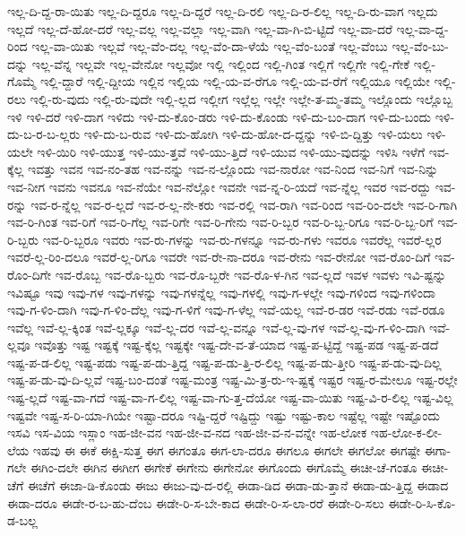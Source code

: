 {ಇಲ್ಲ-ದಿ-ದ್ದ-ರಾ-ಯಿತು
ಇಲ್ಲ-ದಿ-ದ್ದರೂ
ಇಲ್ಲ-ದಿ-ದ್ದರೆ
ಇಲ್ಲ-ದಿ-ರಲಿ
ಇಲ್ಲ-ದಿ-ರ-ಲಿಲ್ಲ
ಇಲ್ಲ-ದಿ-ರು-ವಾಗ
ಇಲ್ಲದು
ಇಲ್ಲದೆ
ಇಲ್ಲ-ದೆ-ಹೋ-ದರೆ
ಇಲ್ಲ-ವಲ್ಲ
ಇಲ್ಲ-ವಲ್ಲಾ
ಇಲ್ಲ-ವಾಗಿ
ಇಲ್ಲ-ವಾ-ಗಿ-ಬಿ-ಟ್ಟಿದೆ
ಇಲ್ಲ-ವಾ-ದರೆ
ಇಲ್ಲ-ವಾ-ದ್ದ-ರಿಂದ
ಇಲ್ಲ-ವಾ-ಯಿತು
ಇಲ್ಲವೆ
ಇಲ್ಲ-ವೆಂ-ದಲ್ಲ
ಇಲ್ಲ-ವೆಂ-ದಾ-ಳೆಯೆ
ಇಲ್ಲ-ವೆಂ-ಬಂತೆ
ಇಲ್ಲ-ವೆಂಬು
ಇಲ್ಲ-ವೆಂ-ಬು-ದನ್ನು
ಇಲ್ಲ-ವೆನ್ನ
ಇಲ್ಲವೇ
ಇಲ್ಲ-ವೇನೋ
ಇಲ್ಲವೋ
ಇಲ್ಲಿ
ಇಲ್ಲಿಂದ
ಇಲ್ಲಿ-ಗಿಂತ
ಇಲ್ಲಿಗೆ
ಇಲ್ಲಿಗೇ
ಇಲ್ಲಿ-ಗೇಕೆ
ಇಲ್ಲಿ-ಗೊಮ್ಮೆ
ಇಲ್ಲಿ-ದ್ದಾರೆ
ಇಲ್ಲಿ-ದ್ದೀಯ
ಇಲ್ಲಿನ
ಇಲ್ಲಿಯ
ಇಲ್ಲಿ-ಯ-ವ-ರೆಗೂ
ಇಲ್ಲಿ-ಯ-ವ-ರೆಗೆ
ಇಲ್ಲಿಯೂ
ಇಲ್ಲಿಯೇ
ಇಲ್ಲಿ-ರಲು
ಇಲ್ಲಿ-ರು-ವುದು
ಇಲ್ಲಿ-ರು-ವುದೇ
ಇಲ್ಲಿ-ಲ್ಲದ
ಇಲ್ಲೀಗ
ಇಲ್ಲೆಲ್ಲ
ಇಲ್ಲೇ
ಇಲ್ಲೇ-ತ-ಮ್ಮ-ತಮ್ಮ
ಇಲ್ಲೊಂದು
ಇಲ್ಲೊಬ್ಬ
ಇಳಿ
ಇಳಿ-ದರೆ
ಇಳಿ-ದಾಗ
ಇಳಿದು
ಇಳಿ-ದು-ಕೊಂ-ಡರು
ಇಳಿ-ದು-ಕೊಂಡು
ಇಳಿ-ದು-ಬಂ-ದಾಗ
ಇಳಿ-ದು-ಬಂದು
ಇಳಿ-ದು-ಬ-ರ-ಬ-ಲ್ಲರು
ಇಳಿ-ದು-ಬ-ರುವ
ಇಳಿ-ದು-ಹೋಗಿ
ಇಳಿ-ದು-ಹೋ-ದ-ದ್ದನ್ನು
ಇಳಿ-ಬಿ-ದ್ದಿತ್ತು
ಇಳಿ-ಯಲು
ಇಳಿ-ಯಲೇ
ಇಳಿ-ಯಿರಿ
ಇಳಿ-ಯುತ್ತ
ಇಳಿ-ಯು-ತ್ತವೆ
ಇಳಿ-ಯು-ತ್ತಿದೆ
ಇಳಿ-ಯುವ
ಇಳಿ-ಯು-ವುದನ್ನು
ಇಳಿಸಿ
ಇಳೆಗೆ
ಇವ-ಕ್ಕೆಲ್ಲ
ಇವತ್ತು
ಇವನ
ಇವ-ನಂ-ತಹ
ಇವ-ನನ್ನು
ಇವ-ನ-ಲ್ಲೊಂದು
ಇವ-ನಾರೋ
ಇವ-ನಿಂದ
ಇವ-ನಿಗೆ
ಇವ-ನಿನ್ನು
ಇವ-ನೀಗ
ಇವನು
ಇವನೂ
ಇವ-ನೆಯೇ
ಇವ-ನೆಲ್ಲೋ
ಇವನೇ
ಇವ-ನ್ನ-ರಿ-ಯದೆ
ಇವ-ನ್ನೆಲ್ಲ
ಇವರ
ಇವ-ರದ್ದು
ಇವ-ರನ್ನು
ಇವ-ರ-ನ್ನೆಲ್ಲ
ಇವ-ರ-ಲ್ಲದೆ
ಇವ-ರ-ಲ್ಲ-ನೇ-ಕರು
ಇವ-ರಲ್ಲಿ
ಇವ-ರಾಗಿ
ಇವ-ರಿಂದ
ಇವ-ರಿಂ-ದಲೇ
ಇವ-ರಿ-ಗಾಗಿ
ಇವ-ರಿ-ಗಿಂತ
ಇವ-ರಿಗೆ
ಇವ-ರಿ-ಗೆಲ್ಲ
ಇವ-ರಿಗೇ
ಇವ-ರಿ-ಗೇನು
ಇವ-ರಿ-ಬ್ಬರ
ಇವ-ರಿ-ಬ್ಬ-ರಿಗೂ
ಇವ-ರಿ-ಬ್ಬ-ರಿಗೆ
ಇವ-ರಿ-ಬ್ಬರು
ಇವ-ರಿ-ಬ್ಬರೂ
ಇವರು
ಇವ-ರು-ಗಳನ್ನು
ಇವ-ರು-ಗಳನ್ನೂ
ಇವ-ರು-ಗಳು
ಇವರೂ
ಇವರೆಲ್ಲ
ಇವರೆ-ಲ್ಲರ
ಇವರೆ-ಲ್ಲ-ರಿಂ-ದಲೂ
ಇವರೆ-ಲ್ಲ-ರಿಗೂ
ಇವರೇ
ಇವ-ರೇ-ನಾ-ದರೂ
ಇವ-ರೇನು
ಇವ-ರೇನೋ
ಇವ-ರೊಂ-ದಿಗೆ
ಇವ-ರೊಂ-ದಿಗೇ
ಇವ-ರೊಬ್ಬ
ಇವ-ರೊ-ಬ್ಬರು
ಇವ-ರೊ-ಬ್ಬರೇ
ಇವ-ರೊ-ಳ-ಗಿನ
ಇವ-ಲ್ಲದೆ
ಇವಳ
ಇವಳು
ಇವಿ-ಷ್ಟನ್ನು
ಇವಿಷ್ಟೂ
ಇವು
ಇವು-ಗಳ
ಇವು-ಗಳನ್ನು
ಇವು-ಗಳನ್ನೆಲ್ಲ
ಇವು-ಗಳಲ್ಲಿ
ಇವು-ಗ-ಳಲ್ಲೇ
ಇವು-ಗಳಿಂದ
ಇವು-ಗಳಿಂದಾ
ಇವು-ಗ-ಳಿಂ-ದಾಗಿ
ಇವು-ಗ-ಳಿಂ-ದೆಲ್ಲ
ಇವು-ಗ-ಳಿಗೆ
ಇವು-ಗ-ಳೆಲ್ಲ
ಇವೆ-ಯಲ್ಲ
ಇವೆ-ರ-ಡರ
ಇವೆ-ರಡು
ಇವೆ-ರಡೂ
ಇವೆಲ್ಲ
ಇವೆ-ಲ್ಲ-ಕ್ಕಿಂತ
ಇವೆ-ಲ್ಲಕ್ಕೂ
ಇವೆ-ಲ್ಲ-ದರ
ಇವೆ-ಲ್ಲ-ವನ್ನೂ
ಇವೆ-ಲ್ಲ-ವು-ಗಳ
ಇವೆ-ಲ್ಲ-ವು-ಗ-ಳಿಂ-ದಾಗಿ
ಇವೆ-ಲ್ಲವೂ
ಇವೊತ್ತು
ಇಷ್ಟ
ಇಷ್ಟಕ್ಕೆ
ಇಷ್ಟ-ಕ್ಕೆಲ್ಲ
ಇಷ್ಟಕ್ಕೇ
ಇಷ್ಟ-ದೇ-ವ-ತೆ-ಯಾದ
ಇಷ್ಟ-ಪ-ಟ್ಟಿದ್ದೆ
ಇಷ್ಟ-ಪಡ
ಇಷ್ಟ-ಪ-ಡದೆ
ಇಷ್ಟ-ಪ-ಡ-ಲಿಲ್ಲ
ಇಷ್ಟ-ಪಡು
ಇಷ್ಟ-ಪ-ಡು-ತ್ತಿದ್ದ
ಇಷ್ಟ-ಪ-ಡು-ತ್ತಿ-ರ-ಲಿಲ್ಲ
ಇಷ್ಟ-ಪ-ಡು-ತ್ತೀರಿ
ಇಷ್ಟ-ಪ-ಡು-ವು-ದಿಲ್ಲ
ಇಷ್ಟ-ಪ-ಡು-ವು-ದಿ-ಲ್ಲವೆ
ಇಷ್ಟ-ಬಂ-ದಂತೆ
ಇಷ್ಟ-ಮಂತ್ರ
ಇಷ್ಟ-ಮಿ-ತ್ರ-ರು-ಇ-ಷ್ಟಕ್ಕೆ
ಇಷ್ಟರ
ಇಷ್ಟ-ರ-ಮೇಲೂ
ಇಷ್ಟ-ರಲ್ಲೇ
ಇಷ್ಟ-ಲ್ಲದೆ
ಇಷ್ಟ-ವಾ-ಗದೆ
ಇಷ್ಟ-ವಾ-ಗ-ಲಿಲ್ಲ
ಇಷ್ಟ-ವಾ-ಗು-ತ್ತ-ದೆಯೋ
ಇಷ್ಟ-ವಾ-ಯಿತು
ಇಷ್ಟ-ವಿ-ರ-ಲಿಲ್ಲ
ಇಷ್ಟ-ವಿಲ್ಲ
ಇಷ್ಟವೇ
ಇಷ್ಟ-ಸ-ರಿ-ಯಾ-ಗಿಯೇ
ಇಷ್ಟಾ-ದರೂ
ಇಷ್ಟಿ-ದ್ದರೆ
ಇಷ್ಟಿದ್ದು
ಇಷ್ಟು
ಇಷ್ಟು-ಕಾಲ
ಇಷ್ಟೆಲ್ಲ
ಇಷ್ಟೇ
ಇಷ್ಟೊಂದು
ಇಸವಿ
ಇಸ-ವಿಯ
ಇಸ್ಲಾಂ
ಇಹ-ಜೀ-ವನ
ಇಹ-ಜೀ-ವ-ನದ
ಇಹ-ಜೀ-ವ-ನ-ವನ್ನೇ
ಇಹ-ಲೋಕ
ಇಹ-ಲೋ-ಕ-ಲೀ-ಲೆಯ
ಇಹವು
ಈ
ಈಕೆ
ಈಕ್ಷಿ-ಸುತ್ತ
ಈಗ
ಈಗಂತೂ
ಈಗ-ಲಾ-ದರೂ
ಈಗಲೂ
ಈಗಲೇ
ಈಗಲೋ
ಈಗಷ್ಟೇ
ಈಗಾ-ಗಲೇ
ಈಗಿಂ-ದಲೇ
ಈಗಿನ
ಈಗೀಗ
ಈಗೇಕೆ
ಈಗೇನು
ಈಗೇನೋ
ಈಗೊಂದು
ಈಗೊಮ್ಮೆ
ಈಚೀ-ಚೆ-ಗಂತೂ
ಈಚೀ-ಚೆಗೆ
ಈಚೆಗೆ
ಈಜಾ-ಡಿ-ಕೊಂಡು
ಈಜು
ಈಜು-ವು-ದ-ರಲ್ಲಿ
ಈಡಾ-ಡಿದ
ಈಡಾ-ಡು-ತ್ತಾನೆ
ಈಡಾ-ಡು-ತ್ತಿದ್ದ
ಈಡಾದ
ಈಡಾ-ದರೂ
ಈಡೇ-ರ-ಬ-ಹು-ದೆಂಬ
ಈಡೇ-ರಿ-ಸ-ಬೇ-ಕಾದ
ಈಡೇ-ರಿ-ಸ-ಲಾ-ರರೆ
ಈಡೇ-ರಿ-ಸಲು
ಈಡೇ-ರಿ-ಸಿ-ಕೊ-ಡ-ಬಲ್ಲ
}
